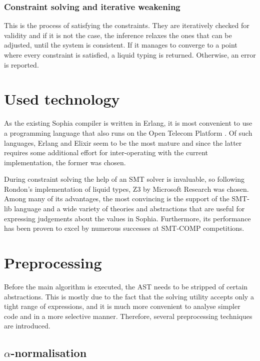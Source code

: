 \subsubsection{Constraint solving and iterative weakening}

This is the process of satisfying the constraints. They are iteratively checked
for validity and if it is not the case, the inference relaxes the ones that can
be adjusted, until the system is consistent. If it manages to converge to a
point where every constraint is satisfied, a liquid typing is returned.
Otherwise, an error is reported.

\section{Used technology}

As the existing Sophia compiler is written in Erlang, it is most convenient to
use a programming language that also runs on the Open Telecom Platform
\cite{ericssonab2021}. Of such languages, Erlang and Elixir seem to be the most
mature and since the latter requires some additional effort for inter-operating
with the current implementation, the former was chosen.

During constraint solving the help of an SMT solver is invaluable, so following
Rondon's implementation of liquid types, Z3 by Microsoft Research
\cite{10.1007/978-3-540-78800-3_24} was chosen. Among many of its advantages,
the most convincing is the support of the SMT-lib language and a wide variety of
theories and abstractions that are useful for expressing judgements about the
values in Sophia. Furthermore, its performance has been proven to excel by
numerous successes at SMT-COMP competitions.

\section{Preprocessing}

Before the main algorithm is executed, the AST needs to be stripped of certain
abstractions. This is mostly due to the fact that the solving utility accepts
only a tight range of expressions, and it is much more convenient to analyse
simpler code and in a more selective manner. Therefore, several preprocessing
techniques are introduced.

\subsection{$\alpha$-normalisation}

